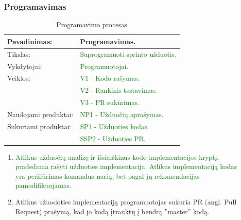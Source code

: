 \documentclass{VUMIFPSkursinis}
\begin{document}
	\subsubsection{Programavimas}
	\begin{center}
		\begin{table}[ht]
			\caption{Programavimo procesas}
			\begin{tabular}{ | l | l | }
				\hline
				Pavadinimas:         & Programavimas.                                     \\ \hline
				Tikslas:             & \textcolor{green}{Suprogramuoti sprinto užduotis.}	\\ \hline
				Vykdytojai:          & \textcolor{green}{Programuotojai.}                 \\ \hline
				Veiklos:             & \textcolor{green}{V1 - Kodo rašymas.}              \\
				                     & \textcolor{green}{V2 - Rankinis testavimas.}       \\
				                     & \textcolor{green}{V3 - PR sukūrimas.}              \\ \hline
				Naudojami produktai: & \textcolor{green}{NP1 - Užduočių aprašymas.}       \\ \hline
				Sukuriami produktai: & \textcolor{green}{SP1 - Užduoties kodas.}          \\
				                     & \textcolor{green}{SSP2 - Užduoties PR.}            \\ \hline
			\end{tabular}
		\end{table}
	\end{center}
		\begin{enumerate}
			\item{
				\textcolor{green}{Atlikus užduočių analizę ir išsiaiškinus kodo implementacijos kryptį, pradedama rašyti užduoties implementacija.
				Atlikus implementaciją kodas yra peržiūrimas komandus narių, bet pagal jų rekomendacijas pamodifikuojamas.}
			}
			\item{Atlikus užuodoties implementaciją programuotojas sukuria PR (angl. Pull Request) prašymą, kad jo kodą įtrauktų į bendrą ''master'' kodą.}
		\end{enumerate}
\end{document}
